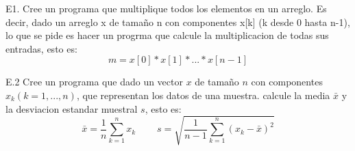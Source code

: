 \documentclass[12pt,letterpaper]{report}
\author{Andrés Limón Cruz }
\begin{document}
E1. Cree un programa que multiplique todos los elementos en un arreglo. Es decir, dado un arreglo x de tamaño n con componentes x[k] (k desde 0 hasta n-1), lo que se pide es hacer un progrma que calcule la multiplicacion de todas sus entradas, esto es: 
$$
 m = x[0] * x[1] * ... * x[n-1]
$$

E.2 Cree un programa que dado un vector $x$ de tamaño $n$ con componentes $x_k (k = 1,...,n)$, que representan los datos de una muestra. calcule la media $\bar{x}$ y la desviacion estandar muestral $s$, esto es:
$$
\bar{x} = \frac{1}{n} \sum_{k=1}^{n} x_k~~~~~~~~~~
s = \sqrt{\dfrac{1}{n-1} \sum_{k=1}^{n} (x_k - \bar{x})^2}
$$
\end{document}
